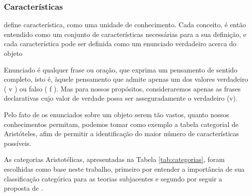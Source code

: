 \subsubsection{\hspace*{3pt} Características}

\citet{dahlberg:1978.teoria} define característica, como uma unidade de conhecimento. Cada conceito, é então entendido como um conjunto de características necessárias para a sua definição, e cada característica pode ser definida como um enunciado verdadeiro acerca do objeto \citep{dahlberg:1978.fundamentos}

Enunciado é qualquer frase ou oração, que exprima um pensamento de sentido completo, isto é, àquele pensamento que admite apenas um dos valores verdadeiro ( v ) ou falso ( f ). Mas para nossos propósitos, consideraremos apenas as frases declarativas cujo valor de verdade possa ser asseguradamente o verdadeiro (v). 

Pelo fato de os enunciados sobre um objeto serem tão vastos, quanto nossos conhecimentos permitam, podemos tomar como exemplo a tabela categorial de Aristóteles, afim de permitir a identificação do maior número de características possíveis.

As categorias Aristotélicas, apresentadas na Tabela \ref{tab:categorias}, foram escolhidas como base neste trabalho, primeiro por entender a importância de sua classificação categórica para as teorias subjacentes e segundo por seguir a proposta de \citep{dahlberg:1978.fundamentos}. 

